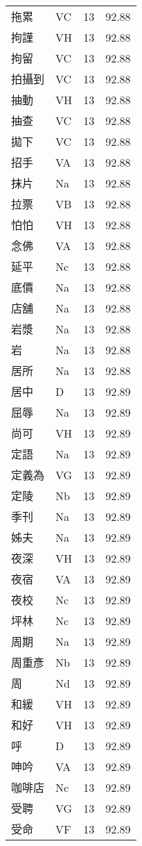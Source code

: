 \documentclass[twocolumn]{book}
\begin{document}
\begin{supertabular}{llrr}
拖累 & VC & 13 &  92.88\\
拘謹 & VH & 13 &  92.88\\
拘留 & VC & 13 &  92.88\\
拍攝到 & VC & 13 &  92.88\\
抽動 & VH & 13 &  92.88\\
抽查 & VC & 13 &  92.88\\
拋下 & VC & 13 &  92.88\\
招手 & VA & 13 &  92.88\\
抹片 & Na & 13 &  92.88\\
拉票 & VB & 13 &  92.88\\
怕怕 & VH & 13 &  92.88\\
念佛 & VA & 13 &  92.88\\
延平 & Nc & 13 &  92.88\\
底價 & Na & 13 &  92.88\\
店舖 & Na & 13 &  92.88\\
岩漿 & Na & 13 &  92.88\\
岩 & Na & 13 &  92.88\\
居所 & Na & 13 &  92.88\\
居中 & D & 13 &  92.89\\
屈辱 & Na & 13 &  92.89\\
尚可 & VH & 13 &  92.89\\
定語 & Na & 13 &  92.89\\
定義為 & VG & 13 &  92.89\\
定陵 & Nb & 13 &  92.89\\
季刊 & Na & 13 &  92.89\\
姊夫 & Na & 13 &  92.89\\
夜深 & VH & 13 &  92.89\\
夜宿 & VA & 13 &  92.89\\
夜校 & Nc & 13 &  92.89\\
坪林 & Nc & 13 &  92.89\\
周期 & Na & 13 &  92.89\\
周重彥 & Nb & 13 &  92.89\\
周 & Nd & 13 &  92.89\\
和緩 & VH & 13 &  92.89\\
和好 & VH & 13 &  92.89\\
呼 & D & 13 &  92.89\\
呻吟 & VA & 13 &  92.89\\
咖啡店 & Nc & 13 &  92.89\\
受聘 & VG & 13 &  92.89\\
受命 & VF & 13 &  92.89\\

\end{supertabular}
\end{document}

